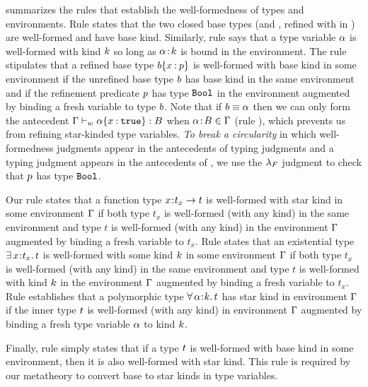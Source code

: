 %
 summarizes the rules
that establish the well-formedness of types
and environments. 
%
Rule \wtBase states that the two closed base
types (\tint and \tbool, 
refined with \ttrue in \sysrf)
are well-formed and have base kind.
%
Similarly, rule \wtVar says that a %
type variable $\alpha$ is well-formed with kind $k$
so long as ${{\alpha}\!:\!{k}}$ is bound in the environment.
%
The rule \wtRefn stipulates that a refined base type ${{b}\{x \mathbin{:} p\}}$
is well-formed with base kind in some environment
if the unrefined base type $b$
has base kind in the same environment and if
the refinement predicate $p$ has type $\texttt{Bool}$
in the environment augmented by binding a fresh variable to type $b$.
Note that if $b \equiv \alpha$ then we can only form the antecedent
${\mathrm{\Gamma}} \vdash_w {{{\alpha}\{x \mathbin{:} \mathtt{true}\}}} : {B}$
when ${{\alpha}\!:\!{B}} \in \mathrm{\Gamma}$ (rule \wtVar),
which prevents us from refining star-kinded type variables.
%
\textit{To break a circularity}
in which well-formedness judgments 
appear in the antecedents  of
typing judgments and a typing judgment
appears in the antecedents
of \wtRefn, we use the $\lambda_{F}$
judgment to check that $p$ has
type $\texttt{Bool}$.
%
\begin{fullversion}
  Our rule \wtFunc states that a function
  type $x\hspace{0.05em}{:}\hspace{0.05em} t_x \rightarrow t$ is well-formed
  with star kind in some environment $\mathrm{\Gamma}$
  if both type $t_x$ is well-formed (with any kind)
  in the same environment and type $t$
  is well-formed (with any kind) in the
  environment $\mathrm{\Gamma}$ augmented by binding
  a fresh variable to $t_x$.
  Rule \wtExis states that an existential
  type $\exists\, x\hspace{0.05em}{:}\hspace{0.05em} t_x.\, t$ is well-formed
  with some kind $k$ in some environment
  $\mathrm{\Gamma}$ if both type $t_x$ is well-formed
  (with any kind) in the same environment
  and type $t$ is well-formed with kind
  $k$ in the environment $\mathrm{\Gamma}$
  augmented by binding a fresh variable
  to $t_x$.
  Rule \wtPoly establishes that a
  polymorphic type $\forall\, \alpha\hspace{0.05em}{:}\hspace{0.05em} k.\, t$
  has star kind in environment $\mathrm{\Gamma}$ if the
  inner type $t$ is well-formed (with any kind)
  in environment $\mathrm{\Gamma}$ augmented by binding a fresh
  type variable $\alpha$ to kind $k$.
\end{fullversion}
%
Finally, rule \wtKind simply states that if a type $t$
is well-formed with base kind in some environment, then
it is also well-formed with star kind. %
This rule is required by our metatheory to convert base to star
kinds in type variables.

